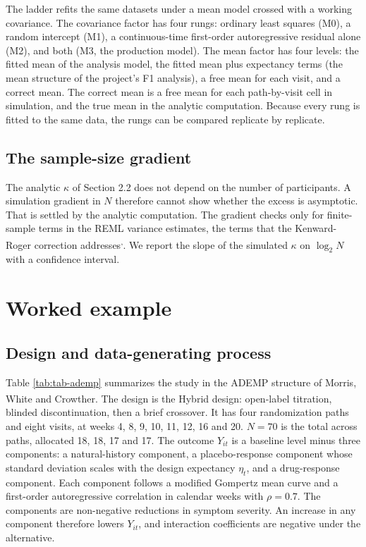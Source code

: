 \documentclass[
  11pt,
]{article}
\begin{document}
The ladder refits the same datasets under a mean model crossed with a
working covariance. The covariance factor has four rungs: ordinary
least squares (M0), a random intercept (M1), a continuous-time
first-order autoregressive residual alone (M2), and both (M3, the
production model). The mean factor has four levels: the fitted mean
of the analysis model, the fitted mean plus expectancy terms (the mean
structure of the project's F1 analysis), a free mean for each visit,
and a correct mean. The correct mean is a free mean for each
path-by-visit cell in simulation, and the true mean in the analytic
computation. Because every rung is fitted to the same data, the rungs
can be compared replicate by replicate.

\subsection{The sample-size gradient}\label{the-sample-size-gradient}

The analytic \(\kappa\) of Section 2.2 does not depend on the number of
participants. A simulation gradient in \(N\) therefore cannot show
whether the excess is asymptotic. That is settled by the analytic
computation. The gradient checks only for finite-sample terms in the
REML variance estimates, the terms that the Kenward-Roger correction
addresses\textsuperscript{,}. We report the slope of
the simulated \(\kappa\) on \(\log_2 N\) with a confidence interval.

\section{Worked example}\label{sec-example}

\subsection{Design and data-generating process}\label{design-and-data-generating-process}

Table \ref{tab:tab-ademp} summarizes the study in the ADEMP structure
of Morris, White and Crowther\textsuperscript{}. The design is
the Hybrid design: open-label titration, blinded discontinuation, then
a brief crossover. It has four randomization paths and eight visits,
at weeks 4, 8, 9, 10, 11, 12, 16 and 20. \(N = 70\) is the total across
paths, allocated 18, 18, 17 and 17. The outcome \(Y_{it}\) is a
baseline level minus three components: a natural-history component, a
placebo-response component whose standard deviation scales with the
design expectancy \(\eta_t\), and a drug-response component. Each
component follows a modified Gompertz mean curve and a first-order
autoregressive correlation in calendar weeks with \(\rho = 0.7\). The
components are non-negative reductions in symptom severity. An
increase in any component therefore lowers \(Y_{it}\), and interaction
coefficients are negative under the alternative.
\end{document}
